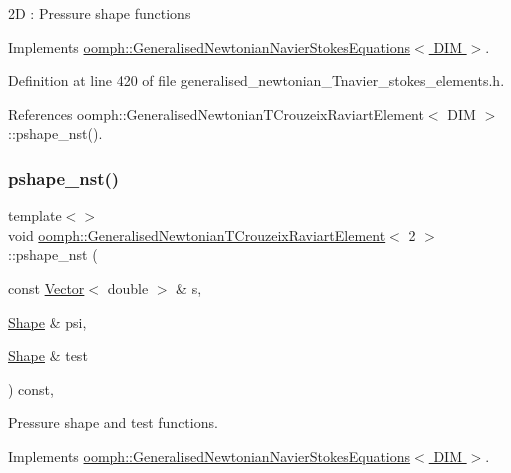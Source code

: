 2D \+: Pressure shape functions 

Implements \hyperlink{classoomph_1_1GeneralisedNewtonianNavierStokesEquations_a84735d21f3d1ade819726a71a7b462e1}{oomph\+::\+Generalised\+Newtonian\+Navier\+Stokes\+Equations$<$ D\+I\+M $>$}.



Definition at line 420 of file generalised\+\_\+newtonian\+\_\+\+Tnavier\+\_\+stokes\+\_\+elements.\+h.



References oomph\+::\+Generalised\+Newtonian\+T\+Crouzeix\+Raviart\+Element$<$ D\+I\+M $>$\+::pshape\+\_\+nst().

\mbox{\label{classoomph_1_1GeneralisedNewtonianTCrouzeixRaviartElement_a566a1f5f33884ebac7995fef3fca1ccd}} 
\subsubsection{\texorpdfstring{pshape\+\_\+nst()}{pshape\_nst()}\hspace{0.1cm}{\footnotesize\ttfamily [4/6]}}
{\footnotesize\ttfamily template$<$$>$ \\
void \hyperlink{classoomph_1_1GeneralisedNewtonianTCrouzeixRaviartElement}{oomph\+::\+Generalised\+Newtonian\+T\+Crouzeix\+Raviart\+Element}$<$ 2 $>$\+::pshape\+\_\+nst (\begin{DoxyParamCaption}\item[{const \hyperlink{classoomph_1_1Vector}{Vector}$<$ double $>$ \&}]{s,  }\item[{\hyperlink{classoomph_1_1Shape}{Shape} \&}]{psi,  }\item[{\hyperlink{classoomph_1_1Shape}{Shape} \&}]{test }\end{DoxyParamCaption}) const\hspace{0.3cm}{\ttfamily [inline]}, {\ttfamily [virtual]}}



Pressure shape and test functions. 



Implements \hyperlink{classoomph_1_1GeneralisedNewtonianNavierStokesEquations_afb01a54f377b1bebe141ed8e11ced138}{oomph\+::\+Generalised\+Newtonian\+Navier\+Stokes\+Equations$<$ D\+I\+M $>$}.




